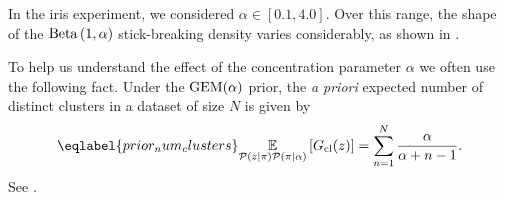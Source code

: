 In the iris experiment, we considered $\alpha\in[0.1, 4.0]$.
Over this range, the shape of
the $\mathrm{Beta}\left(1, \alpha\right)$ stick-breaking density varies considerably, as shown in
.

\BetaPriorsEx

To help us understand the effect of the concentration parameter
$\alpha$ we often use the following fact. Under the $\mathrm{GEM}(\alpha)$ prior, the {\em a priori} expected
number of distinct clusters in a dataset of size $N$ is given by
%
\begin{align}\eqlabel{prior_num_clusters}
\expect{\p(\z \vert \pi)\p(\pi \vert \alpha)}{\nclusters(\z)} =
\sum_{\n = 1}^\N \frac{\alpha}{\alpha + \n - 1}.
\end{align}
%
See \citep[Equation 11]{Teh:2010:dp}.
